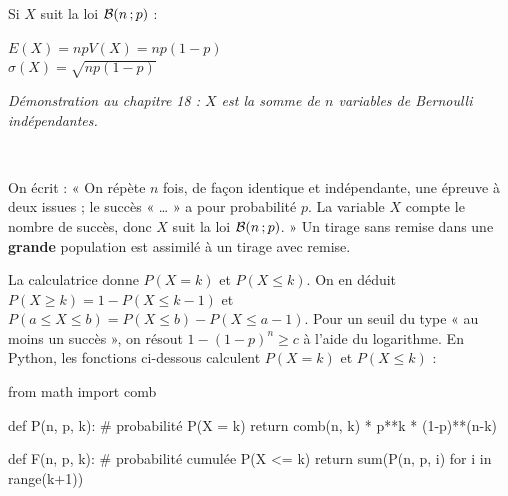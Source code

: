 \noindent
\begin{minipage}[c]{0.46\linewidth}
\begin{theoreme}
\raggedright
Si $X$ suit la loi $\mathcal{B}(n\,{;}\, p)$ :\\[1.5mm]
{\centering $E(X)=np$\qquad $V(X)=np(1-p)$\\[1mm] $\sigma(X)=\sqrt{np(1-p)}$\par}\vspace{1.5mm}
\emph{Démonstration au chapitre 18 : $X$ est la somme de $n$ variables de Bernoulli indépendantes.}
\end{theoreme}
\end{minipage}\hfill
\begin{minipage}[c]{0.5\linewidth}
\centering
{}\\[0.5mm]
\end{minipage}


\begin{savoirfaire}
On écrit : « On répète $n$ fois, de façon identique et indépendante, une épreuve à deux issues ; le succès « … » a pour
probabilité $p$. La variable $X$ compte le nombre de succès, donc $X$ suit la loi $\mathcal{B}(n\,{;}\, p)$. » Un tirage sans remise
dans une \textbf{grande} population est assimilé à un tirage avec remise.
\end{savoirfaire}

\begin{savoirfaire}
La calculatrice donne $P(X=k)$ et $P(X\leq k)$. On en déduit $P(X\geq k)=1-P(X\leq k-1)$ et
$P(a\leq X\leq b)=P(X\leq b)-P(X\leq a-1)$. Pour un seuil du type « au moins un succès », on résout $1-(1-p)^{n}\geq c$ à l'aide du
logarithme. En Python, les fonctions ci-dessous calculent $P(X=k)$ et $P(X\leq k)$ :
\end{savoirfaire}
\begin{python}
from math import comb

def P(n, p, k):     # probabilité P(X = k)
    return comb(n, k) * p**k * (1-p)**(n-k)

def F(n, p, k):     # probabilité cumulée P(X <= k)
    return sum(P(n, p, i) for i in range(k+1))
\end{python}

